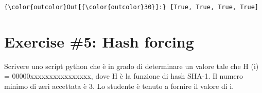 \documentclass[11pt]{article}
\begin{document}
\begin{Verbatim}[commandchars=\\\{\}]
{\color{outcolor}Out[{\color{outcolor}30}]:} [True, True, True, True]
\end{Verbatim}
            
    \hypertarget{exercise-5-hash-forcing}{%
\section{Exercise \#5: Hash forcing}\label{exercise-5-hash-forcing}}

    Scrivere uno script python che è in grado di determinare un valore tale
che H (i) = 00000xxxxxxxxxxxxxxxx, dove H è la funzione di hash SHA-1.
Il numero minimo di zeri accettata è 3. Lo studente è tenuto a fornire
il valore di i.
\end{document}
